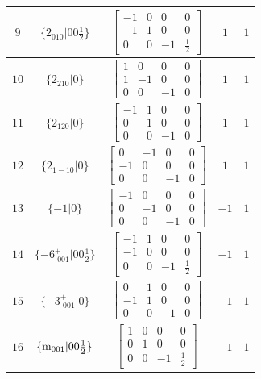\documentclass[fleqn,8pt]{jsarticle}
\begin{document}
\begin{longtable}{ccccc}
$ 9 $ & $ \{2{}_{010}|0 0 \frac{1}{2}\} $ & $ \begin{bmatrix} -1 & 0 & 0 & 0 \\ -1 & 1 & 0 & 0 \\ 0 & 0 & -1 & \frac{1}{2} \end{bmatrix} $ & $ 1 $ & $ 1 $ \\ \hline
$ 10 $ & $ \{2{}_{210}|0\} $ & $ \begin{bmatrix} 1 & 0 & 0 & 0 \\ 1 & -1 & 0 & 0 \\ 0 & 0 & -1 & 0 \end{bmatrix} $ & $ 1 $ & $ 1 $ \\ \hline
$ 11 $ & $ \{2{}_{120}|0\} $ & $ \begin{bmatrix} -1 & 1 & 0 & 0 \\ 0 & 1 & 0 & 0 \\ 0 & 0 & -1 & 0 \end{bmatrix} $ & $ 1 $ & $ 1 $ \\ \hline
$ 12 $ & $ \{2{}_{1-10}|0\} $ & $ \begin{bmatrix} 0 & -1 & 0 & 0 \\ -1 & 0 & 0 & 0 \\ 0 & 0 & -1 & 0 \end{bmatrix} $ & $ 1 $ & $ 1 $ \\ \hline
$ 13 $ & $ \{-1|0\} $ & $ \begin{bmatrix} -1 & 0 & 0 & 0 \\ 0 & -1 & 0 & 0 \\ 0 & 0 & -1 & 0 \end{bmatrix} $ & $ -1 $ & $ 1 $ \\ \hline
$ 14 $ & $ \{-6^{+}_{\,\,001}|0 0 \frac{1}{2}\} $ & $ \begin{bmatrix} -1 & 1 & 0 & 0 \\ -1 & 0 & 0 & 0 \\ 0 & 0 & -1 & \frac{1}{2} \end{bmatrix} $ & $ -1 $ & $ 1 $ \\ \hline
$ 15 $ & $ \{-3^{+}_{\,\,001}|0\} $ & $ \begin{bmatrix} 0 & 1 & 0 & 0 \\ -1 & 1 & 0 & 0 \\ 0 & 0 & -1 & 0 \end{bmatrix} $ & $ -1 $ & $ 1 $ \\ \hline
$ 16 $ & $ \{{\rm m}_{001}|0 0 \frac{1}{2}\} $ & $ \begin{bmatrix} 1 & 0 & 0 & 0 \\ 0 & 1 & 0 & 0 \\ 0 & 0 & -1 & \frac{1}{2} \end{bmatrix} $ & $ -1 $ & $ 1 $ \\ \hline

\end{longtable}
\end{document}
